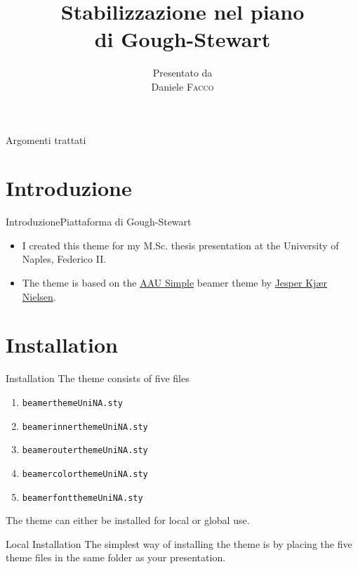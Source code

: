 \documentclass[10pt,aspectratio=43
	]{beamer}
\title[Stabilizzazione nel piano di Gough-Stewart] %
	{\huge Stabilizzazione nel piano\\ di Gough-Stewart} %
\author[Daniele Facco]%
	{%
		{\footnotesize Presentato da}\\
		Daniele \textsc{Facco}%
	}
\institute[
		Dipartimento di ingegneria e architettura\\
		Università degli Studi di Trieste\\
		Italia
	]
	{%
		Università degli Studi di Trieste
	}
\begin{document}
	\maketitle

	\begin{frame}{Argomenti trattati}{}
		\tableofcontents
	\end{frame}

	\section{Introduzione}
	\begin{frame}{Introduzione}{Piattaforma di Gough-Stewart}
			\begin{itemize}[<+->]
				\item I created this theme for my M.Sc. thesis presentation at the University of Naples, Federico II.
				\item The theme is based on the \href{https://github.com/jkjaer/aauLatexTemplates/tree/master/aauBeamer/aausimplerg}{\alert{AAU Simple}} beamer theme by 
				\href{https://github.com/jkjaer}{\alert{Jesper Kjær Nielsen}}.
			\end{itemize}
	\end{frame}

	\section{Installation}
	\begin{frame}{Installation}
	The theme consists of five files
	\begin{enumerate}
		\item {\tt beamerthemeUniNA.sty}
		\item {\tt beamerinnerthemeUniNA.sty}
		\item {\tt beamerouterthemeUniNA.sty}
		\item {\tt beamercolorthemeUniNA.sty}
		\item {\tt beamerfontthemeUniNA.sty}
	\end{enumerate}
	The theme can either be installed for local or global use.
	\pause
	\begin{block}{Local Installation}
		The simplest way of installing the theme is by placing the five theme files in the same 
		folder as your presentation.
	\end{block}
	\end{frame}
\end{document}
